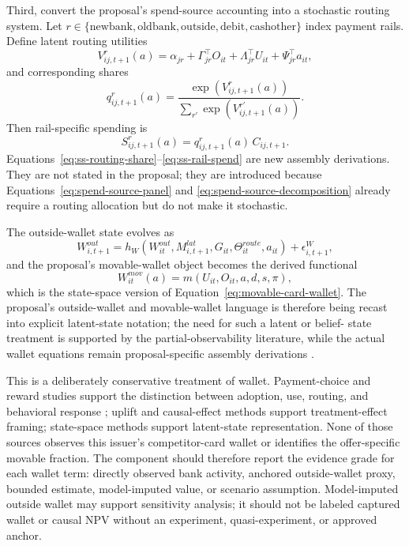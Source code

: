\documentclass[11pt]{article}
\newcommand{\1}{\mathbf{1}}
\begin{document}
Third, convert the proposal's spend-source accounting into a stochastic routing
system. Let $r\in\{\mathrm{newbank},\mathrm{oldbank},\mathrm{outside},\mathrm{debit},\mathrm{cashother}\}$
index payment rails. Define latent routing utilities
\begin{equation}
  V^{r}_{ij,t+1}(a)
  =
  \alpha_{jr} + \Gamma_{jr}^{\top}O_{it} + \Lambda_{jr}^{\top}U_{it}
  + \Psi_{jr}^{\top}a_{it},
  \label{eq:ss-routing-utility}
\end{equation}
and corresponding shares
\begin{equation}
  q^r_{ij,t+1}(a)
  =
  \frac{\exp(V^r_{ij,t+1}(a))}{\sum_{r'}\exp(V^{r'}_{ij,t+1}(a))}.
  \label{eq:ss-routing-share}
\end{equation}
Then rail-specific spending is
\begin{equation}
  S^r_{ij,t+1}(a) = q^r_{ij,t+1}(a)\,C_{ij,t+1}.
  \label{eq:ss-rail-spend}
\end{equation}
Equations~\eqref{eq:ss-routing-share}--\eqref{eq:ss-rail-spend} are new
assembly derivations. They are not stated in the proposal; they are introduced
because Equations~\eqref{eq:spend-source-panel} and
\eqref{eq:spend-source-decomposition} already require a routing allocation but
do not make it stochastic.

The outside-wallet state evolves as
\begin{equation}
  W^{out}_{i,t+1}
  =
  h_W(W^{out}_{it},M^{lat}_{i,t+1},G_{it},\Theta^{route}_{it},a_{it})
  + \epsilon^W_{i,t+1},
  \label{eq:ss-outside-wallet-transition}
\end{equation}
and the proposal's movable-wallet object becomes the derived functional
\begin{equation}
  W^{mov}_{it}(a)
  =
  m(U_{it},O_{it},a,d,s,\pi),
  \label{eq:ss-movable-wallet}
\end{equation}
which is the state-space version of Equation~\eqref{eq:movable-card-wallet}.
The proposal's outside-wallet and movable-wallet language is therefore being
recast into explicit latent-state notation; the need for such a latent or belief-
state treatment is supported by the partial-observability literature, while the
actual wallet equations remain proposal-specific assembly derivations
\citep{smallwood1973pomdp,kaelbling1998pomdp}.

This is a deliberately conservative treatment of wallet. Payment-choice and
reward studies support the distinction between adoption, use, routing, and
behavioral response \citep{koulayev2012payment,prelec2001creditcard,
agarwal2010rewards}; uplift and causal-effect methods support treatment-effect
framing; state-space methods support latent-state representation. None of those
sources observes this issuer's competitor-card wallet or identifies the
offer-specific movable fraction. The component should therefore report the
evidence grade for each wallet term: directly observed bank activity, anchored
outside-wallet proxy, bounded estimate, model-imputed value, or scenario
assumption. Model-imputed outside wallet may support sensitivity analysis; it
should not be labeled captured wallet or causal NPV without an experiment,
quasi-experiment, or approved anchor.
\end{document}
